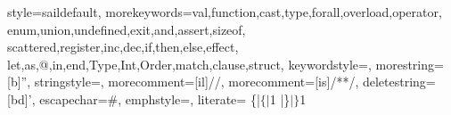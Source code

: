 \usepackage[T1]{fontenc}
\usepackage[scaled=0.82]{beramono}
\usepackage{amssymb}


  {style=saildefault,
   morekeywords={val,function,cast,type,forall,overload,operator,
                 enum,union,undefined,exit,and,assert,sizeof,
                 scattered,register,inc,dec,if,then,else,effect,
                 let,as,@,in,end,Type,Int,Order,match,clause,struct},
   keywordstyle={\bf\ttfamily},
   morestring=[b]'',
   stringstyle={\ttfamily\color{red}},
   morecomment=[il]{//},
   morecomment=[is]{/*}{*/},
   deletestring=[bd]{'},
   escapechar=\#,
   emphstyle={\it},
   literate=
      {\{|}{{$\{|$}}1
      {|\}}{{$|\}$}}1
  }


{
  \newcommand{\saildocfcl}[2]{}
  \newcommand{\saildocfn}[2]{}
  \newcommand{\saildoctype}[2]{}
}

\newenvironment{formalspec}
{ \vspace{-0.2in}
  \begin{quotation}
  \noindent
  \small \em
  \rule{\linewidth}{1pt}\\
}
{
  \rule{\linewidth}{1pt}
  \end{quotation}
  \vspace{-0.2in}
}
\newenvironment{formalcomment}
{ \vspace{-0.4in}
  \begin{quotation}
  \noindent
  \small \\%
}
{ \hfill \\
  \rule{\linewidth}{1pt}
  \end{quotation}
  \vspace{-0.2in}
}
